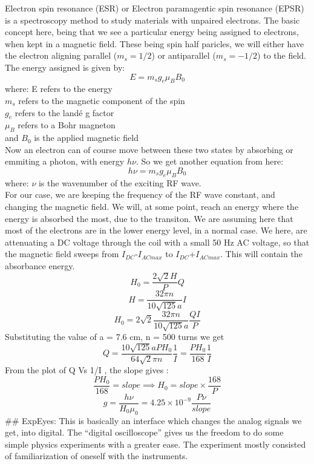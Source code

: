 \documentclass{../_layouts/ieeeconf}
\begin{document}
Electron spin resonance (ESR) or Electron paramagentic spin resonance (EPSR) is a spectroscopy method to study materials with unpaired electrons. The basic concept here, being that we see a particular energy being assigned to electrons, when kept in a magnetic field. These being spin half paricles, we will either have the electron aligning parallel (\(m_s = 1/2\)) or antiparallel (\(m_s = -1/2\)) to the field. The energy assigned is given by:
\[ E = m_s g_e \mu_B B_0 \]
where:
E refers to the energy\\
\(m_s\) refers to the magnetic component of the spin\\
\(g_e\) refers to the landé g factor\\
\(\mu_B\) refers to a Bohr magneton\\
and \(B_0\) is the applied magnetic field\\
Now an electron can of course move between these two states by absorbing or emmiting a photon, with energy \(h\nu\). So we get another equation from here:\\
\[ h\nu=m_s g_e \mu_B B_0 \]
where:
\(\nu\) is the wavenumber of the exciting RF wave.\\
For our case, we are keeping the frequency of the RF wave constant, and changing the magnetic field. We will, at some point, reach an energy where the energy is absorbed the most, due to the transiton. We are assuming here that most of the electrons are in the lower energy level, in a normal case.
We here, are attenuating a DC voltage through the coil with a small 50 Hz AC voltage, so that the magnetic field sweeps from \(I_{DC}\)-\(I_{AC max}\) to \(I_{DC}\)+\(I_{AC max}\). This will contain the absorbance energy.
\[ H_0 = \frac{2\sqrt{2}H}{P}Q \]
\[ H=\frac{32\pi n}{10\sqrt{125}a}I \]
\[ H_0=2\sqrt{2}\frac{32\pi n}{10\sqrt{125}a}\frac{QI}{P} \]
Substituting the value of a = 7.6 cm, n = 500 turns we get
\begin{equation} Q=\frac{10\sqrt{125}a PH_0}{64\sqrt{2}\pi n }\frac{1}{I}=\frac{PH_0}{168}\frac{1}{I} \label{eq:desc}\end{equation}
From the plot of Q Vs 1/I , the slope gives :
\[ \frac{PH_0}{168}=slope \implies H_0=slope \times \frac{168}{P} \]
\[ g=\frac{h \nu}{H_0 \mu_0} = 4.25\times10^{-9} \frac{P \nu}{slope} \]
\#\# ExpEyes:
This is basically an interface which changes the analog signals we get, into digital. The ``digital oscilloscope'' gives us the freedom to do some simple physics experiments with a greater ease. The experiment mostly consisted of familiarization of oneself with the instruments.
\end{document}
